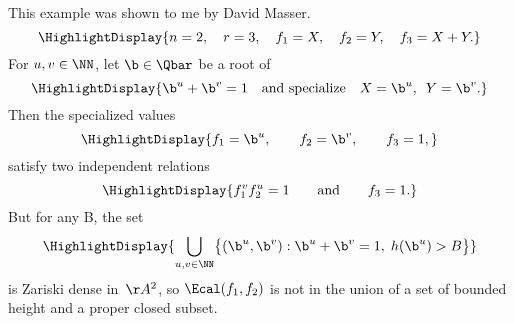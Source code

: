 \documentclass[12pt]{article}
\begin{document}
\BeginSlide
{}
\vspace{-10pt}
This example was shown to me by David Masser.
\[\HighlightDisplay{
  n=2,\quad r=3,\quad f_1=X,\quad f_2=Y,\quad f_3=X+Y.
  }
\]
\EndPart
\vspace{-17pt}
For $u,v\in\NN$, let $\b\in\Qbar$ be a root of
\[\HighlightDisplay{
  \b^u + \b^v = 1
  \quad\text{and specialize}\quad
  X = \b^u,\enspace Y=\b^v.
  }
\]
\EndPart
\vspace{-17pt}
Then the specialized values
\vspace{-5pt}
\[\HighlightDisplay{
  f_1 = \b^u,\qquad f_2=\b^v,\qquad f_3=1,
  }
\]
satisfy two independent relations
\[\HighlightDisplay{
  f_1^vf_2^u=1\qquad\text{and}\qquad f_3=1.
  }
\]
\EndPart
\vspace{-17pt}
But for any B, the set
\[\HighlightDisplay{
  \bigcup_{u,v\in\NN}
  \bigl\{(\b^u,\b^v) : \b^u+\b^v=1,\;h(\b^u)>B\bigr\}
  }
\]
is Zariski dense in~$\AA^2$, so $\Ecal(f_1,f_2)$ is not %
in the union of a set of bounded height and a proper %
closed subset.
\EndSlide

\end{document}
